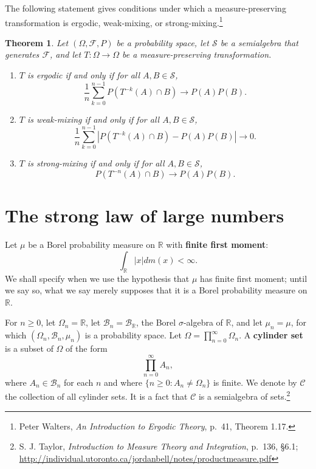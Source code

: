 \documentclass{article}
\newtheorem{theorem}{Theorem}
\theoremstyle{definition}
\begin{document}
The following statement gives conditions under which a measure-preserving transformation
is ergodic, weak-mixing, or strong-mixing.\footnote{Peter Walters,
{\em An Introduction to Ergodic Theory}, p.~41, Theorem 1.17.}

\begin{theorem}
Let $(\Omega,\mathscr{F},P)$ be a probability space, let $\mathscr{S}$ be a semialgebra that generates
$\mathscr{F}$, and let $T:\Omega \to \Omega$ be a measure-preserving transformation.
\begin{enumerate}
\item $T$ is ergodic if and only if
for all $A,B \in \mathscr{S}$,
\[
\frac{1}{n} \sum_{k=0}^{n-1} P(T^{-k}(A) \cap B) \to P(A)P(B).
\]
\item $T$ is weak-mixing if and only if for all $A,B \in \mathscr{S}$,
\[
\frac{1}{n} \sum_{k=0}^{n-1} |P(T^{-k}(A) \cap B) - P(A)P(B)| \to 0.
\]
\item $T$ is strong-mixing if and only if for all $A,B \in \mathscr{S}$,
\[
P(T^{-n}(A) \cap B) \to P(A)P(B).
\]
\label{ergodic}
\end{enumerate}
\end{theorem}



\section{The strong law of large numbers}
Let $\mu$ be a Borel probability measure on $\mathbb{R}$ with \textbf{finite first moment}:
\[
\int_{\mathbb{R}} |x| dm(x) < \infty.
\]
We shall specify when we use the hypothesis that $\mu$ has finite first moment; until we say so, what we say merely
supposes that it is a Borel probability measure on $\mathbb{R}$.

For $n \geq 0$, let $\Omega_n = \mathbb{R}$, let
$\mathscr{B}_n=\mathscr{B}_{\mathbb{R}}$, the Borel $\sigma$-algebra of $\mathbb{R}$, and let $\mu_n=\mu$,
for which  $(\Omega_n,\mathscr{B}_n,\mu_n)$ is a probability space. 
Let $\Omega=\prod_{n=0}^\infty \Omega_n$. A \textbf{cylinder set} is a subset of $\Omega$ of the form
\[
\prod_{n=0}^\infty A_n,
\]
where $A_n \in \mathscr{B}_n$ for each $n$ and where $\{n \geq 0: A_n \neq \Omega_n\}$ is finite. 
We denote by $\mathscr{C}$ the collection of all cylinder sets. It is a fact that
$\mathscr{C}$ is a semialgebra of sets.\footnote{S. J. Taylor, {\em Introduction to Measure Theory and Integration},
p.~136, \S 6.1;
\url{http://individual.utoronto.ca/jordanbell/notes/productmeasure.pdf}}
\end{document}
